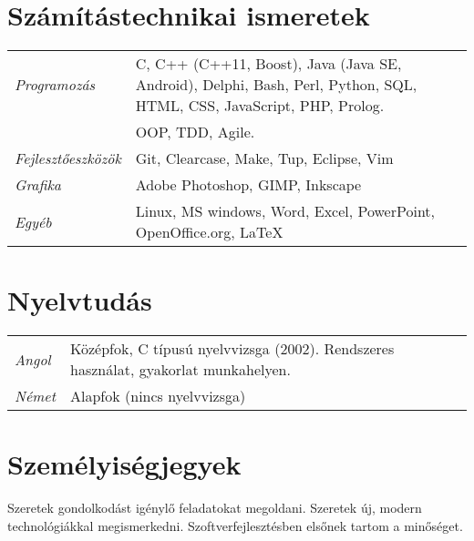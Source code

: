 \documentclass[a4paper,10pt]{article}
\newcommand{\pont}[1]{\emph{#1}}
\begin{document}
\section*{Számítástechnikai ismeretek}
\begin{tabular}{lp{12cm}}
 \pont{Programozás}&C, C++ (C++11, Boost), Java (Java SE, Android), Delphi, Bash, Perl, Python, SQL, HTML, CSS, JavaScript, PHP, Prolog.\\
 &OOP, TDD, Agile.\\
 \pont{Fejlesztőeszközök}&Git, Clearcase, Make, Tup, Eclipse, Vim\\
 \pont{Grafika}&Adobe Photoshop, GIMP, Inkscape\\
 \pont{Egyéb}&Linux, MS windows, Word, Excel, PowerPoint, OpenOffice.org, LaTeX
\end{tabular}

\section*{Nyelvtudás}
\begin{tabular}{ll}
 \pont{Angol}&Középfok, C típusú nyelvvizsga (2002). Rendszeres használat, gyakorlat munkahelyen.\\
 \pont{Német}&Alapfok (nincs nyelvvizsga)
\end{tabular}

\section*{Személyiségjegyek}
Szeretek gondolkodást igénylő feladatokat megoldani. Szeretek új, modern technológiákkal megismerkedni. Szoftverfejlesztésben elsőnek tartom a minőséget.
\end{document}
